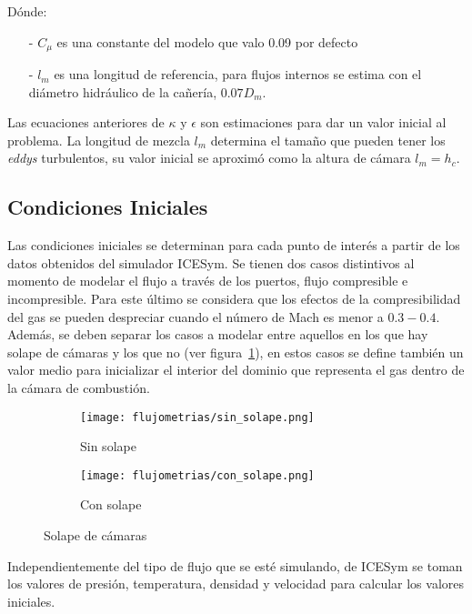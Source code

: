Dónde:
\begin{itemize}
 \item[-] $C_{\mu}$ es una constante del modelo que valo 0.09 por defecto
 \item[-] $l_{m}$ es una longitud de referencia, para flujos internos se estima con el diámetro hidráulico de la cañería, $0.07 D_{m}$.
\end{itemize}


Las ecuaciones anteriores de  $\kappa$ y $\epsilon$ son estimaciones para dar un
valor inicial al problema.
%
La longitud de mezcla $l_m$ determina el tamaño que pueden tener los
\emph{eddys} turbulentos, su valor inicial se aproximó como la altura de cámara
$l_m = h_c$.

\subsection{Condiciones Iniciales}\label{cap2:cond_iniciales}
%
Las condiciones iniciales se determinan para cada punto de interés a partir de
los datos obtenidos del simulador ICESym.
%
Se tienen dos casos distintivos al momento de modelar el flujo a través de los
puertos, flujo compresible e incompresible.
%
Para este último se considera que los efectos de la compresibilidad del gas se
pueden despreciar cuando el número de Mach es menor a $0.3-0.4$.
%
Además, se deben separar los casos a modelar entre aquellos en los que hay
solape de cámaras y los que no (ver figura~\ref{fig:solape}), en estos casos se
define también un valor medio para inicializar el interior del dominio que
representa el gas dentro de la cámara de combustión.

\begin{figure}[t!]
  \centering
    \begin{subfigure}[t]{0.4\textwidth}
        \centering
        \texttt{[image: flujometrias/sin\_solape.png]}
        \caption{Sin solape}
    \end{subfigure}%
    \begin{subfigure}[t]{0.4\textwidth}
        \centering
        \texttt{[image: flujometrias/con\_solape.png]}
        \caption{Con solape}
    \end{subfigure}
  \caption{Solape de cámaras}\label{fig:solape}
\end{figure}

Independientemente del tipo de flujo que se esté simulando, de ICESym se toman
los valores de presión, temperatura, densidad y velocidad para calcular los
valores iniciales.

